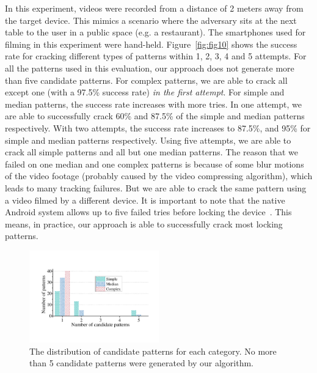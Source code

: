         In this experiment, videos were recorded from a distance of 2 meters away
        from the target device. This mimics a scenario where the adversary sits
        at the next table to the user in a public space (e.g. a restaurant).
        The smartphones used for filming in this experiment were hand-held.
        Figure~\ref{fig:fig10}
        shows the success rate for cracking different types of patterns within 1, 2, 3, 4 and 5 attempts.     For all the patterns used in this evaluation,
        our approach does not generate more than  five candidate patterns.
        For complex patterns, we are able to crack all except one (with a 97.5\% success rate) \emph{in the first attempt}.
        For simple and median patterns, the success rate increases with more tries.
        In one attempt, we are able to
        successfully crack 60\% and 87.5\% of the simple and median patterns respectively. With two attempts, the success rate increases to 87.5\%,
        and 95\% for simple and median patterns
        respectively. Using five attempts, we are able to
        crack all simple patterns and all but one median patterns.
       The reason that we failed on one median and one complex patterns is because of some blur motions of the video footage (probably
       caused by the video compressing algorithm), which leads
       to many tracking failures. But we are able to crack the same
       pattern using a video filmed by a different device.
        It is important to note that the native Android system allows up to five failed tries before locking the device~\cite{egelman2014you}. This means, in practice, our approach is able to
        successfully crack most locking patterns.
        
\begin{figure}[!t]
    \centering
    \includegraphics[width=0.5\textwidth]{fig/11.pdf}
    \caption{The distribution of candidate patterns for each category. No more than 5 candidate patterns were generated by our algorithm. }
    \label{fig:fig11}
\end{figure}

